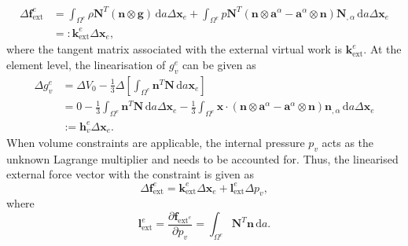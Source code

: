 \begin{equation}\label{eq:del_f_ext_dead_def}
    \begin{split}
        \Delta \mathbf{f}_{\mathrm{ext}}^{e} &= \int_{\Omega^{e}} \rho \mathbf{N}^{T} \left( \boldsymbol{n} \otimes \boldsymbol{g} \right) \, \mathrm{d} a \Delta \mathbf{x}_{e} + \int_{\Omega^{e}} p \mathbf{N}^{T} \left( \boldsymbol{n} \otimes \boldsymbol{a}^{\alpha} - \boldsymbol{a}^{\alpha} \otimes \boldsymbol{n} \right) \mathbf{N}_{, \alpha} \, \mathrm{d} a \Delta \mathbf{x}_{e}\\
        &=: \mathbf{k}_{\text{ext}}^{e} \Delta \mathbf{x}_{e},
    \end{split}
\end{equation}
where the tangent matrix associated with the external virtual work is $\mathbf{k}_{\text{ext}}^{e}$.
At the element level, the linearisation of $g_{v}^{e}$ can be given as
\begin{equation} \label{lin_vol_constraint}
    \begin{split}
        \Delta g_{v}^{e} &= \Delta V_{0} - \frac{1}{3} \Delta \left[\int_{\Omega^{e}} \boldsymbol{n}^{T} \mathbf{N} \,\mathrm{d} a \mathbf{x}_{e}\right]\\
                        &= 0 - \frac{1}{3}\int_{\Omega^{e}}\boldsymbol{n}^{T} \mathbf{N} \,\mathrm{d}a \Delta \mathbf{x}_{e}
                        - \frac{1}{3} \int_{\Omega^{e}} \boldsymbol{x} \cdot \left(\boldsymbol{n} \otimes \boldsymbol{a}^{\alpha} - \boldsymbol{a}^{\alpha} \otimes \boldsymbol{n}\right)\mathbf{n}_{,\alpha}\, \mathrm{d}a \Delta \boldsymbol{x}_{e}\\
                        &:= \mathbf{h}_{v}^{e} \Delta \mathbf{x}_{e}.
    \end{split}
\end{equation}
When volume constraints are applicable, the internal pressure $p_{v}$ acts as the unknown Lagrange multiplier and needs to be accounted for.
Thus, the linearised external force vector with the constraint is given as
\begin{equation} \label{del_f_ext_const}
    \Delta \mathbf{f}_{\text{ext}}^{e} = \mathbf{k}_{\text{ext}}^{e} \Delta \mathbf{x}_{e} + \mathbf{l}^{e}_{\text{ext}} \Delta p_{v},
\end{equation}
where
\begin{equation}
    \mathbf{l}_{\text{ext}}^{e} = \frac{\partial \mathbf{f}_{\text{ext}^{e}}}{\partial p_{v}} = \int_{\Omega^{e}} \mathbf{N}^{T} \boldsymbol{n} \,\mathrm{d}a.
\end{equation}
